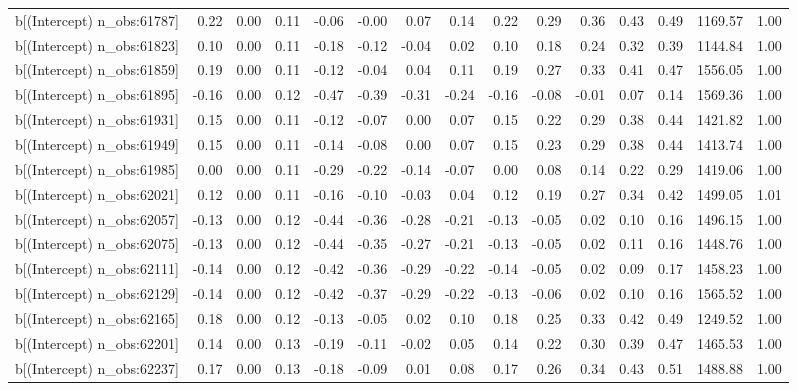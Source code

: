 \begin{table}[ht]
\begin{tabular}{rrrrrrrrrrrrrrr}
  b[(Intercept) n\_obs:61787] & 0.22 & 0.00 & 0.11 & -0.06 & -0.00 & 0.07 & 0.14 & 0.22 & 0.29 & 0.36 & 0.43 & 0.49 & 1169.57 & 1.00 \\ 
  b[(Intercept) n\_obs:61823] & 0.10 & 0.00 & 0.11 & -0.18 & -0.12 & -0.04 & 0.02 & 0.10 & 0.18 & 0.24 & 0.32 & 0.39 & 1144.84 & 1.00 \\ 
  b[(Intercept) n\_obs:61859] & 0.19 & 0.00 & 0.11 & -0.12 & -0.04 & 0.04 & 0.11 & 0.19 & 0.27 & 0.33 & 0.41 & 0.47 & 1556.05 & 1.00 \\ 
  b[(Intercept) n\_obs:61895] & -0.16 & 0.00 & 0.12 & -0.47 & -0.39 & -0.31 & -0.24 & -0.16 & -0.08 & -0.01 & 0.07 & 0.14 & 1569.36 & 1.00 \\ 
  b[(Intercept) n\_obs:61931] & 0.15 & 0.00 & 0.11 & -0.12 & -0.07 & 0.00 & 0.07 & 0.15 & 0.22 & 0.29 & 0.38 & 0.44 & 1421.82 & 1.00 \\ 
  b[(Intercept) n\_obs:61949] & 0.15 & 0.00 & 0.11 & -0.14 & -0.08 & 0.00 & 0.07 & 0.15 & 0.23 & 0.29 & 0.38 & 0.44 & 1413.74 & 1.00 \\ 
  b[(Intercept) n\_obs:61985] & 0.00 & 0.00 & 0.11 & -0.29 & -0.22 & -0.14 & -0.07 & 0.00 & 0.08 & 0.14 & 0.22 & 0.29 & 1419.06 & 1.00 \\ 
  b[(Intercept) n\_obs:62021] & 0.12 & 0.00 & 0.11 & -0.16 & -0.10 & -0.03 & 0.04 & 0.12 & 0.19 & 0.27 & 0.34 & 0.42 & 1499.05 & 1.01 \\ 
  b[(Intercept) n\_obs:62057] & -0.13 & 0.00 & 0.12 & -0.44 & -0.36 & -0.28 & -0.21 & -0.13 & -0.05 & 0.02 & 0.10 & 0.16 & 1496.15 & 1.00 \\ 
  b[(Intercept) n\_obs:62075] & -0.13 & 0.00 & 0.12 & -0.44 & -0.35 & -0.27 & -0.21 & -0.13 & -0.05 & 0.02 & 0.11 & 0.16 & 1448.76 & 1.00 \\ 
  b[(Intercept) n\_obs:62111] & -0.14 & 0.00 & 0.12 & -0.42 & -0.36 & -0.29 & -0.22 & -0.14 & -0.05 & 0.02 & 0.09 & 0.17 & 1458.23 & 1.00 \\ 
  b[(Intercept) n\_obs:62129] & -0.14 & 0.00 & 0.12 & -0.42 & -0.37 & -0.29 & -0.22 & -0.13 & -0.06 & 0.02 & 0.10 & 0.16 & 1565.52 & 1.00 \\ 
  b[(Intercept) n\_obs:62165] & 0.18 & 0.00 & 0.12 & -0.13 & -0.05 & 0.02 & 0.10 & 0.18 & 0.25 & 0.33 & 0.42 & 0.49 & 1249.52 & 1.00 \\ 
  b[(Intercept) n\_obs:62201] & 0.14 & 0.00 & 0.13 & -0.19 & -0.11 & -0.02 & 0.05 & 0.14 & 0.22 & 0.30 & 0.39 & 0.47 & 1465.53 & 1.00 \\ 
  b[(Intercept) n\_obs:62237] & 0.17 & 0.00 & 0.13 & -0.18 & -0.09 & 0.01 & 0.08 & 0.17 & 0.26 & 0.34 & 0.43 & 0.51 & 1488.88 & 1.00 \\ 

\end{tabular}
\end{table}
